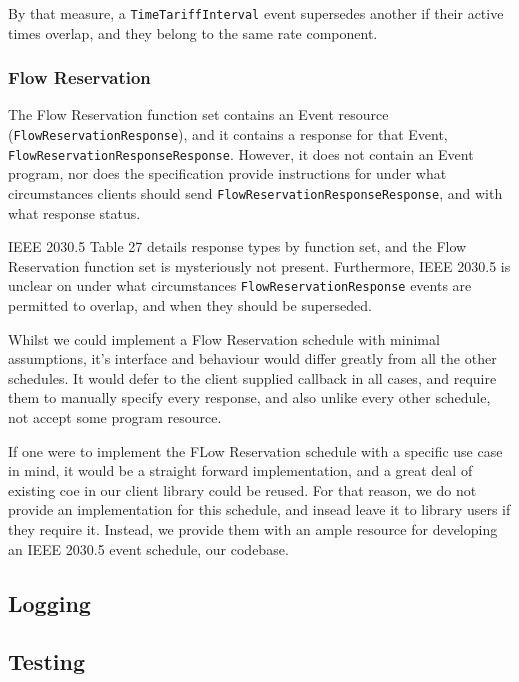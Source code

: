 By that measure, a \texttt{TimeTariffInterval} event supersedes another if their active times overlap, and they belong to the same rate component.

\subsubsection{Flow Reservation}
The Flow Reservation function set contains an Event resource (\texttt{FlowReservationResponse}), and it contains a response for that Event, \texttt{FlowReservationResponseResponse}. However, it does not contain an Event program, nor does the specification provide instructions for under what circumstances clients should send \texttt{FlowReservationResponseResponse}, and with what response status.

IEEE 2030.5 Table 27 details response types by function set, and the Flow Reservation function set is mysteriously not present. Furthermore, IEEE 2030.5 is unclear on under what circumstances \texttt{FlowReservationResponse} events are permitted to overlap, and when they should be superseded. 

Whilst we could implement a Flow Reservation schedule with minimal assumptions, it's interface and behaviour would differ greatly from all the other schedules. It would defer to the client supplied callback in all cases, and require them to manually specify every response, and also unlike every other schedule, not accept some program resource.

If one were to implement the FLow Reservation schedule with a specific use case in mind, it would be a straight forward implementation, and a great deal of existing coe in our client library could be reused. For that reason, we do not provide an implementation for this schedule, and insead leave it to library users if they require it. Instead, we provide them with an ample resource for developing an IEEE 2030.5 event schedule, our codebase.

\subsection{Logging}

\subsection{Testing}

